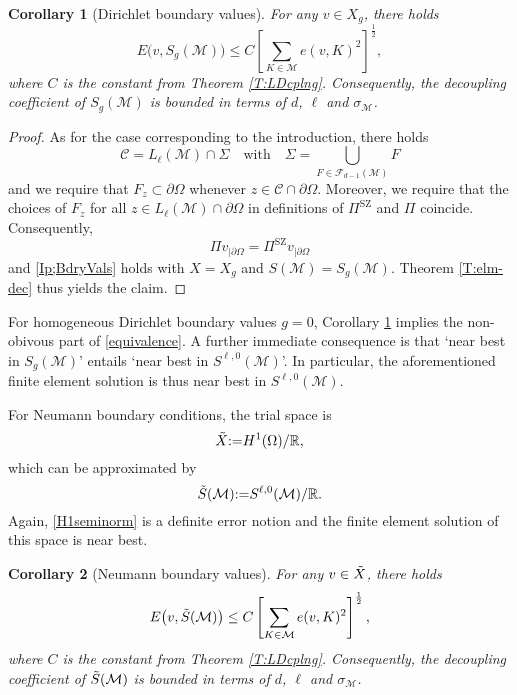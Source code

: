 \documentclass[a4paper]{amsart}
\numberwithin{equation}{section}
\theoremstyle{plain}
\newtheorem{cor}{Corollary}[section]
\theoremstyle{definition}
\begin{document}
\begin{cor}[Dirichlet boundary values]
\label{C:Dirichlet}
For any $v\in X_g$, there holds
\[
  E\big( v,{S}_g({\mathcal{M}}) \big)
 \leq
 C  \left[
  \sum_{{K}\in{\mathcal{M}}} e(v,{K})^2
 \right]^{\frac12},
\]
where $C$ is the constant from Theorem \ref{T:LDcplng}.  Consequently, the 
decoupling coefficient of ${S}_g({\mathcal{M}})$ is bounded in terms of $d$, 
${\ell}$ and $\sigma_{\mathcal{M}}$.
\end{cor}

\begin{proof}
As for the case corresponding to the introduction, there holds
\[
 {\mathcal{C}} = {L_{{\ell}}}({\mathcal{M}}) \cap {\Sigma}
\quad\text{with}\quad
 {\Sigma}
 =
 \bigcup_{{F}\in{\mathcal{F}_{d-1}}({\mathcal{M}})} {F}
\]
and we require that ${F}_z\subset\partial\Omega$ whenever 
$z\in{\mathcal{C}}\cap\partial\Omega$.  Moreover, we require that the choices of 
${F}_z$ for all $z\in{L_{{\ell}}}({\mathcal{M}})\cap\partial\Omega$ in definitions 
of ${\Pi^{\text{SZ}}}$ and ${\Pi}$ coincide.  Consequently,
\[
 {\Pi} v_{|\partial\Omega}
  =
 {\Pi^{\text{SZ}}} v_{|\partial\Omega}
\]
and \eqref{Ip;BdryVals} holds with $X=X_g$ and 
${S}({\mathcal{M}})={S}_g({\mathcal{M}})$. Theorem \ref{T:elm-dec} thus yields the
claim.
\end{proof}
For homogeneous Dirichlet boundary values $g=0$, Corollary \ref{C:Dirichlet}
implies the non-obivous part of \eqref{equivalence}. A further immediate
consequence is that `near best in ${S}_g({\mathcal{M}})$' entails `near best in 
${S}^{{\ell},0}({\mathcal{M}})$'.  In particular, the aforementioned finite element 
solution is thus near best in ${S}^{{\ell},0}({\mathcal{M}})$.

For Neumann boundary conditions, the trial space is
\[
 \Tilde X {:=} {H^{1}}(\Omega)/{\mathbb{R}},
\]
which can be approximated by
\[
 \Tilde{S}({\mathcal{M}})
 {:=}
 {S}^{{\ell},0}({\mathcal{M}})/{\mathbb{R}}.
\]
Again, \eqref{H1seminorm} is a definite error notion and the finite element
solution of this space is near best.
 
\begin{cor}[Neumann boundary values]
\label{C:Neumann}
For any $v\in \Tilde X$, there holds
\[
  E\big( v, \Tilde{S}({\mathcal{M}}) \big)
 \leq
 C  \left[
  \sum_{{K}\in{\mathcal{M}}} e(v,{K})^2
 \right]^{\frac12},
\]
where $C$ is the constant from Theorem \ref{T:LDcplng}.  Consequently,
the decoupling coefficient of $\Tilde{S}({\mathcal{M}})$ is bounded
in terms of $d$, ${\ell}$ and $\sigma_{\mathcal{M}}$.
\end{cor}
\end{document}
